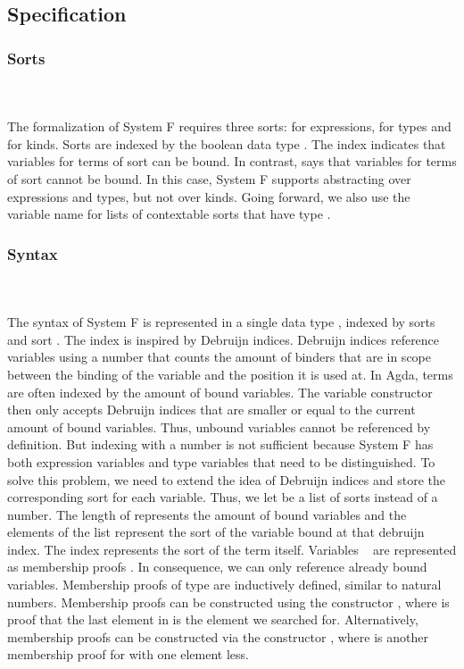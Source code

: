 \subsection{Specification}
\subsubsection{Sorts}\hfill\\\\
The formalization of System F requires three sorts:  for expressions,  for types and  for kinds. 
\FSort
Sorts are indexed by the boolean data type . 
The index  indicates that variables for terms of sort  can be bound. 
In contrast,  says that variables for terms of sort  cannot be bound. 
In this case, System F supports abstracting over expressions and types, but not over kinds. 
Going forward, we also use the variable name  for lists of contextable sorts that have type \FSorts.

\subsubsection{Syntax}\hfill\\\\
The syntax of System F is represented in a single data type , indexed by sorts  and sort . 
The index  is inspired by Debruijn indices. Debruijn indices reference variables using a number that counts the amount of binders that are in scope between the binding of the variable and the position it is used at.
In Agda, terms are often indexed by the amount of bound variables. The variable constructor then only accepts Debruijn indices that are smaller or equal to the current amount of bound variables. 
Thus, unbound variables cannot be referenced by definition.
But indexing  with a number is not sufficient because System F has both expression variables and type variables that need to be distinguished. 
To solve this problem, we need to extend the idea of Debruijn indices and store the corresponding sort for each variable. Thus, we let  be a list of sorts instead of a number.
The length of  represents the amount of bound variables and the elements  of the list represent the sort of the variable bound at that debruijn index. 
The index  represents the sort of the term itself.
\FTerm
Variables \  are represented as membership proofs   . In consequence, we can only reference already bound variables.
Membership proofs of type    are inductively defined, similar to natural numbers. 
Membership proofs can be constructed using the constructor , where  is proof that the last element in  is the element we searched for. Alternatively, membership proofs can be constructed via the constructor  , where  is another membership proof for  with one element less. 

